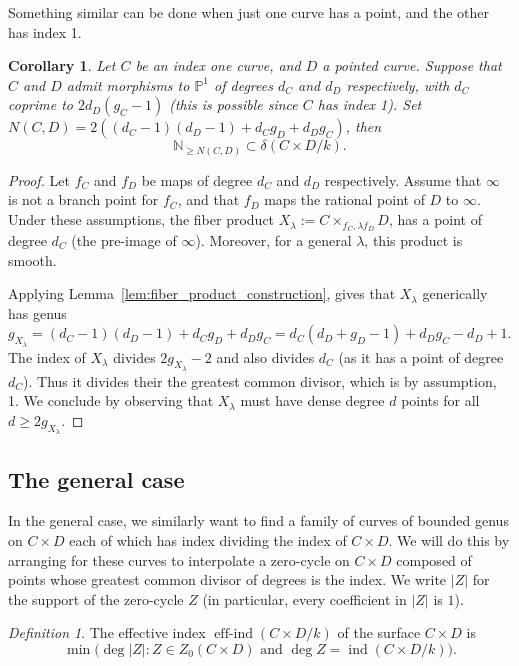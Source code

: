 \documentclass[a4paper,11pt]{amsart}
\theoremstyle{plain}
\newtheorem{coroll}[thm]{Corollary}
\theoremstyle{remark}
\newtheorem{defn}[thm]{Definition}
\newcommand{\dendegs}{\delta}
\newcommand{\ind}{\operatorname{ind}}
\newcommand{\effind}{\operatorname{eff-ind}}
\newcommand{\defi}[1]{\textsf{#1}} %
\begin{document}
Something similar can be done when just one curve has a point, and the other has index 1.
\begin{coroll}\label{cor:pointedcurvexind1}
    Let $C$ be an index one curve, and $D$ a pointed curve. Suppose that $C$ and $D$ admit morphisms to $\mathbb{P}^1$ of degrees $d_C$ and $d_D$ respectively, with $d_C$ coprime to $2 d_D (g_C - 1)$ (this is possible since $C$ has index 1). Set $N(C, D) = 2\left((d_C - 1)(d_D - 1) + d_C g_D + d_D g_C\right)$, then
    $$\mathbb{N}_{\geq N(C, D)} \subset \dendegs(C \times D / k).$$
\end{coroll}
\begin{proof}
    Let $f_C$ and $f_D$ be maps of degree $d_C$ and $d_D$ respectively. Assume that $\infty$ is not a branch point for $f_C$, and that $f_D$ maps the rational point of $D$ to $\infty$. Under these assumptions, the fiber product $X_{\lambda} := C \times_{f_C, \lambda f_D} D$, has a point of degree $d_C$ (the pre-image of $\infty$). Moreover, for a general $\lambda$, this product is smooth.

    Applying Lemma~\ref{lem:fiber_product_construction}, gives that $X_{\lambda}$ generically has genus $g_{X_\lambda} = (d_C - 1)(d_D - 1) + d_C g_D + d_D g_C = d_C(d_D + g_D - 1) + d_D g_C - d_D + 1$. The index of $X_{\lambda}$ divides $2g_{X_{\lambda}} - 2$ and also divides $d_C$ (as it has a point of degree $d_C$).  Thus it divides their the greatest common divisor, which is by assumption, 1. We conclude by observing that $X_{\lambda}$ must have dense degree $d$ points for all $d \geq 2g_{X_{\lambda}}$.
\end{proof}

\subsection{The general case}

In the general case, we similarly want to find a family of curves of bounded genus on \(C \times D\) each of which has index dividing the index of \(C \times D\). 
We will do this by arranging for these curves to interpolate a zero-cycle on \(C \times D\) composed of points whose greatest common divisor of degrees is the index. We write \(|Z|\) for the support of the zero-cycle \(Z\)  (in particular, every coefficient in \(|Z|\) is \(1\)).

\begin{defn}\label{def:effind}
    The \defi{effective index} \(\effind(C \times D/k)\) of the surface \(C \times D\) is
    \[\min\big(\deg|Z| : Z \in Z_0(C \times D) \text{ and } \deg Z = \ind(C \times D/k) \big).\]
\end{defn}
\end{document}
